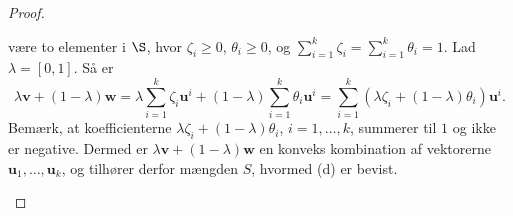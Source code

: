 \begin{proof}
\begin{enumerate}[label=(\alph*)]
%
være to elementer i $\S$, hvor $ \zeta_i \geq 0$, $ \theta_i \geq 0$, og $ \sum_{i=1}^{k} \zeta_i = \sum_{i=1}^{k} \theta_i = 1$. 
Lad $ \lambda = [0,1]$. 
Så er $$\lambda \textbf{v} + (1 - \lambda ) \textbf{w} = \lambda \sum_{i=1}^k \zeta_i \textbf{u}^i + (1 - \lambda) \sum_{i=1}^k \theta_i \textbf{u}^i = \sum_{i=1}^k (\lambda \zeta_i + (1-\lambda )\theta_i ) \textbf{u}^i.$$
Bemærk, at koefficienterne $ \lambda \zeta_i + (1 - \lambda) \theta_i$, $i = 1, \ldots, k$, summerer til $1$ og ikke er negative. 
Dermed er $ \lambda \textbf{v} + (1 - \lambda ) \textbf{w}$ en konveks kombination af vektorerne $\textbf{u}_1, \ldots, \textbf{u}_k$, og tilhører derfor mængden $S$, hvormed (d) er bevist. 
\end{enumerate}
\end{proof}